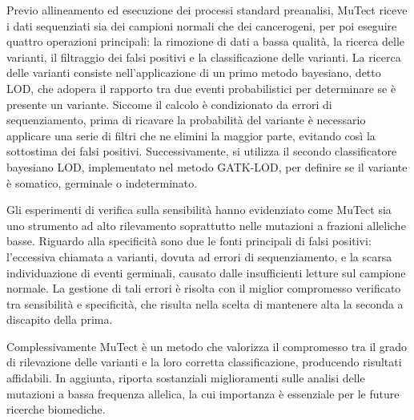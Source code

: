 Previo allineamento ed esecuzione dei processi standard preanalisi, MuTect riceve i dati sequenziati sia dei campioni normali che dei cancerogeni, per poi eseguire quattro operazioni principali: la rimozione di dati a bassa qualità, la ricerca delle varianti, il filtraggio dei falsi positivi e la classificazione delle varianti.
La ricerca delle varianti consiste nell'applicazione di un primo metodo bayesiano, detto LOD, che adopera il rapporto tra due eventi probabilistici per determinare se è presente un variante.
Siccome il calcolo è condizionato da errori di sequenziamento, prima di ricavare la probabilità del variante è necessario applicare una serie di filtri che ne elimini la maggior parte, evitando così la sottostima dei falsi positivi.
Successivamente, si utilizza il secondo classificatore bayesiano LOD, implementato nel metodo GATK-LOD, per definire se il variante è somatico, germinale o indeterminato.

Gli esperimenti di verifica sulla sensibilità hanno evidenziato come MuTect sia uno strumento ad alto rilevamento soprattutto nelle mutazioni a frazioni alleliche basse.
Riguardo alla specificità sono due le fonti principali di falsi positivi: l'eccessiva chiamata a varianti, dovuta ad errori di sequenziamento, e la scarsa individuazione di eventi germinali, causato dalle insufficienti letture sul campione normale.
La gestione di tali errori è risolta con il miglior compromesso verificato tra sensibilità e specificità, che risulta nella scelta di mantenere alta la seconda a discapito della prima.

Complessivamente MuTect è un metodo che valorizza il compromesso tra il grado di rilevazione delle varianti e la loro corretta classificazione, producendo risultati affidabili.
In aggiunta, riporta sostanziali miglioramenti sulle analisi delle mutazioni a bassa frequenza allelica, la cui importanza è essenziale per le future ricerche biomediche.

